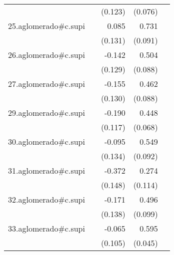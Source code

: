 {\begin{longtable}{l*{4}{D{.}{.}{-1}}}
            &                     &     (0.123)         &     (0.076)         &                     \\
\addlinespace
25.aglomerado#c.supi&                     &       0.085         &       0.731\sym{***}&                     \\
            &                     &     (0.131)         &     (0.091)         &                     \\
\addlinespace
26.aglomerado#c.supi&                     &      -0.142         &       0.504\sym{***}&                     \\
            &                     &     (0.129)         &     (0.088)         &                     \\
\addlinespace
27.aglomerado#c.supi&                     &      -0.155         &       0.462\sym{***}&                     \\
            &                     &     (0.130)         &     (0.088)         &                     \\
\addlinespace
29.aglomerado#c.supi&                     &      -0.190         &       0.448\sym{***}&                     \\
            &                     &     (0.117)         &     (0.068)         &                     \\
\addlinespace
30.aglomerado#c.supi&                     &      -0.095         &       0.549\sym{***}&                     \\
            &                     &     (0.134)         &     (0.092)         &                     \\
\addlinespace
31.aglomerado#c.supi&                     &      -0.372\sym{*}  &       0.274\sym{*}  &                     \\
            &                     &     (0.148)         &     (0.114)         &                     \\
\addlinespace
32.aglomerado#c.supi&                     &      -0.171         &       0.496\sym{***}&                     \\
            &                     &     (0.138)         &     (0.099)         &                     \\
\addlinespace
33.aglomerado#c.supi&                     &      -0.065         &       0.595\sym{***}&                     \\
            &                     &     (0.105)         &     (0.045)         &                     \\

\end{longtable}}
